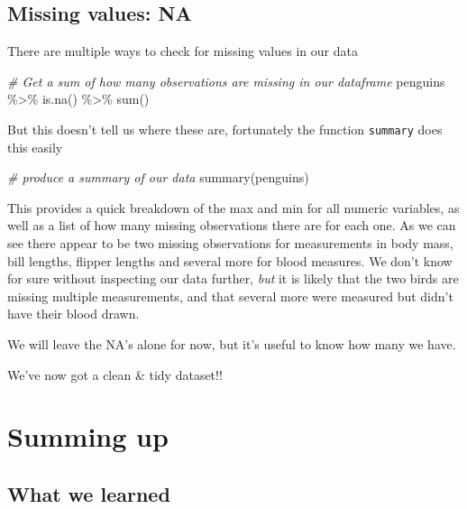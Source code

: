 \documentclass[
]{book}
\newenvironment{Shaded}{\begin{snugshade}}{\end{snugshade}}
\newcommand{\CommentTok}[1]{\textcolor[rgb]{0.56,0.35,0.01}{\textit{#1}}}
\newcommand{\FunctionTok}[1]{\textcolor[rgb]{0.00,0.00,0.00}{#1}}
\newcommand{\NormalTok}[1]{#1}
\newcommand{\SpecialCharTok}[1]{\textcolor[rgb]{0.00,0.00,0.00}{#1}}
\begin{document}
\hypertarget{missing-values-na}{%
\subsection{Missing values: NA}\label{missing-values-na}}

There are multiple ways to check for missing values in our data

\begin{Shaded}
\begin{Highlighting}[]
\CommentTok{\# Get a sum of how many observations are missing in our dataframe}
\NormalTok{penguins }\SpecialCharTok{\%\textgreater{}\%} 
  \FunctionTok{is.na}\NormalTok{() }\SpecialCharTok{\%\textgreater{}\%} 
  \FunctionTok{sum}\NormalTok{()}
\end{Highlighting}
\end{Shaded}

But this doesn't tell us where these are, fortunately the function \texttt{summary} does this easily

\begin{Shaded}
\begin{Highlighting}[]
\CommentTok{\# produce a summary of our data}
\FunctionTok{summary}\NormalTok{(penguins)}
\end{Highlighting}
\end{Shaded}

This provides a quick breakdown of the max and min for all numeric variables, as well as a list of how many missing observations there are for each one. As we can see there appear to be two missing observations for measurements in body mass, bill lengths, flipper lengths and several more for blood measures. We don't know for sure without inspecting our data further, \emph{but} it is likely that the two birds are missing multiple measurements, and that several more were measured but didn't have their blood drawn.

We will leave the NA's alone for now, but it's useful to know how many we have.

We've now got a clean \& tidy dataset!!

\hypertarget{summing-up}{%
\section{Summing up}\label{summing-up}}

\hypertarget{what-we-learned}{%
\subsection{What we learned}\label{what-we-learned}}
\end{document}
